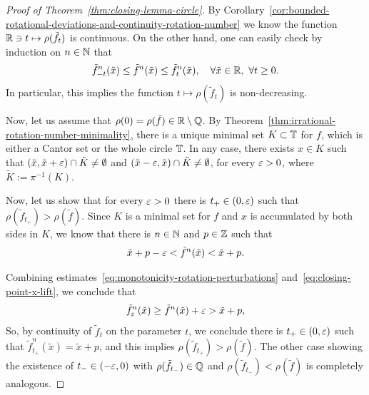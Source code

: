 \begin{proof}[Proof of Theorem~\ref{thm:closing-lemma-circle}]
  By Corollary~\ref{cor:bounded-rotational-deviations-and-continuity-rotation-number} we know the function $\mathbb{R}\ni t\mapsto \rho(\tilde f_t)$ is continuous. On the other hand, one can easily check by induction on $n\in\mathbb{N}$ that
  \begin{equation}
    \label{eq:monotonicity-rotation-perturbations}
    \tilde f_{-t}^n(\tilde x)\leq \tilde f^n(\tilde x)\leq \tilde f_t^n(\tilde x), \quad\forall \tilde x\in\mathbb{R},\ \forall t\geq 0.
  \end{equation}
  In particular, this implies the function $t\mapsto \rho(\tilde f_t)$ is non-decreasing.

  Now, let us assume that $\rho(0)=\rho(\tilde f)\in\mathbb{R}\setminus\mathbb{Q}$. By Theorem~\ref{thm:irrational-rotation-number-minimality}, there is a unique minimal set $K\subset\mathbb{T}$ for $f$, which is either a Cantor set or the whole circle $\mathbb{T}$. In any case, there exists $x\in K$ such that $(\tilde x,\tilde x+\varepsilon)\cap\tilde K\neq\emptyset$ and $(\tilde x-\varepsilon,\tilde x)\cap\tilde K\neq\emptyset$, for every $\varepsilon>0$, where $\tilde K:=\pi^{-1}(K)$.

  Now, let us show that for every $\varepsilon>0$ there is $t_+\in (0,\varepsilon)$ such that $\rho(\tilde f_{t_+})>\rho(\tilde f)$. Since $K$ is a minimal set for $f$ and $x$ is accumulated by both sides in $K$, we know that there is $n\in\mathbb{N}$ and $p\in\mathbb{Z}$ such that
  \begin{equation}
    \label{eq:closing-point-x-lift}
    \tilde x+p-\varepsilon<\tilde f^n(\tilde x)<\tilde x + p.
  \end{equation}

  Combining estimates~\eqref{eq:monotonicity-rotation-perturbations} and~\eqref{eq:closing-point-x-lift}, we conclude that
  \begin{displaymath}
    \tilde f_\varepsilon^n(\tilde x) \geq \tilde f^n(\tilde x) + \varepsilon > \tilde x + p,
  \end{displaymath}
  So, by continuity of $\tilde f_t$ on the parameter $t$, we conclude there is $t_+\in(0,\varepsilon)$ such that $\tilde f_{t_+}^n(\tilde x)=\tilde x+p$, and this implies $\rho(\tilde f_{t_+})>\rho(\tilde f)$. The other case showing the existence of $t_-\in (-\varepsilon,0)$ with $\rho(\tilde f_{t_-})\in\mathbb{Q}$ and $\rho(\tilde f_{t_-})<\rho(\tilde f)$ is completely analogous.
\end{proof}

